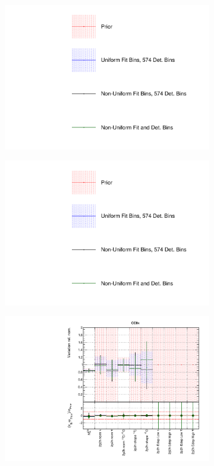 \begin{figure}[!htbp]
\centering
\begin{subfigure}{0.3\textwidth}
  \centering
  \includegraphics[width=1.0\linewidth,  trim={5mm  80mm 0mm 0mm}, clip]{figs/polyasmvs_leg}
\end{subfigure}
\begin{subfigure}{0.3\textwidth}
  \centering
  \includegraphics[width=1.0\linewidth,  trim={5mm  0mm 0mm 95mm}, clip]{figs/polyasmvs_leg}
\end{subfigure}
\begin{subfigure}{0.49\textwidth}
  \centering
  \includegraphics[width=0.9\linewidth]{figs/polyasmvsxsec_1}

\end{subfigure}
\end{figure}
